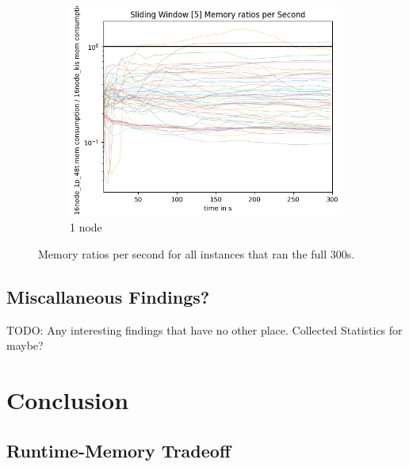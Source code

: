 \documentclass[12pt,a4paper,twoside]{scrartcl}
\numberwithin{equation}{section}
\begin{document}
\begin{figure}
\begin{subfigure}[c]{.4\textwidth}
    \includegraphics[scale=.3]{plots/16node_compare/mem_ratio_per_second.png}
    \caption{1 node}
  \end{subfigure}
  \caption{Memory ratios per second for all instances that ran the full 300s.}
  \label{fig:memRatiosSecs}
\end{figure}







\subsection{Miscallaneous Findings?}

TODO: Any interesting findings that have no other place. Collected Statistics for maybe?


\newpage
\section{Conclusion}

\subsection{Runtime-Memory Tradeoff}
\end{document}
